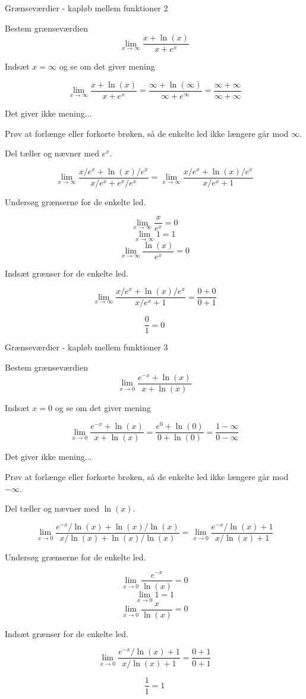 \documentclass{article}
\begin{document}
\begin{exercise}{Grænseværdier - kapløb mellem funktioner 2}

Bestem grænseværdien
\[
\lim_{x \to \infty} \frac{x + \ln(x)}{x + e^x}
\]


\hint
Indsæt $x=\infty$ og se om det giver mening

\hint
\[
\lim_{x \to \infty} \frac{x + \ln(x)}{x + e^x} = \frac{\infty + \ln(\infty)}{\infty + e^\infty} = \frac{\infty + \infty}{\infty + \infty}
\]

\hint
Det giver ikke mening...

\hint
Prøv at forlænge eller forkorte brøken, så de enkelte led ikke længere går mod $\infty$.

\hint
Del tæller og nævner med $e^x$.

\hint
\[
\lim_{x \to \infty} \frac{x/e^x + \ln(x)/e^x}{x/e^x + e^x/e^x} = \lim_{x \to \infty} \frac{x/e^x + \ln(x)/e^x}{x/e^x + 1}
\]

\hint
Undersøg grænserne for de enkelte led.

\hint
\[
\lim_{x \to \infty} \frac{x}{e^x} = 0
\]
\[
\lim_{x \to \infty} 1 = 1
\]
\[
\lim_{x \to \infty} \frac{\ln(x)}{e^x} = 0
\]

\hint
Indsæt grænser for de enkelte led.

\hint
\[
\lim_{x \to \infty} \frac{x/e^x + \ln(x)/e^x}{x/e^x + 1} = \frac{0 + 0}{0 + 1}
\]

\hint
\[
\frac{0}{1} = 0
\]

\end{exercise}
\newpage

\begin{exercise}{Grænseværdier - kapløb mellem funktioner 3}

Bestem grænseværdien
\[
\lim_{x \to 0} \frac{e^{-x}+ \ln(x)}{x + \ln(x)}
\]


\hint
Indsæt $x=0$ og se om det giver mening

\hint
\[
\lim_{x \to 0} \frac{e^{-x}+ \ln(x)}{x + \ln(x)} = \frac{e^{0}+ \ln(0)}{0 + \ln(0)} = \frac{1 - \infty}{0 - \infty}
\]

\hint
Det giver ikke mening...

\hint
Prøv at forlænge eller forkorte brøken, så de enkelte led ikke længere går mod $ - \infty$.

\hint
Del tæller og nævner med $\ln(x)$.

\hint
\[
\lim_{x \to 0} \frac{e^{-x}/\ln(x)+ \ln(x)/\ln(x)}{x/\ln(x) + \ln(x)/\ln(x)} = \lim_{x \to 0} \frac{e^{-x}/\ln(x)+ 1}{x/\ln(x)+1}
\]

\hint
Undersøg grænserne for de enkelte led.

\hint
\[
\lim_{x \to 0} \frac{e^{-x}}{\ln(x)} = 0
\]
\[
\lim_{x \to 0} 1 = 1
\]
\[
\lim_{x \to 0} \frac{x}{\ln(x)} = 0
\]

\hint
Indsæt grænser for de enkelte led.

\hint
\[
\lim_{x \to 0} \frac{e^{-x}/\ln(x)+ 1}{x/\ln(x)+1} = \frac{0+ 1}{0 + 1}
\]

\hint
\[
\frac{1}{1} = 1
\]

\end{exercise}
\newpage
\end{document}

